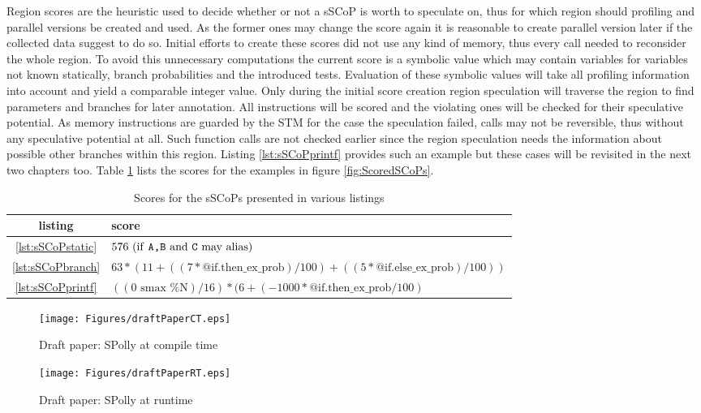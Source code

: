 Region scores are the heuristic used to decide whether or not a sSCoP is worth
to speculate on, thus for which region should profiling and parallel versions
be created and used. As the former ones may change the score again it is 
reasonable to create parallel version later if the collected data suggest to do
so. Initial efforts to create these scores did not use any kind of 
memory, thus every call needed to reconsider the whole region. To avoid this
unnecessary computations the current score is a symbolic value which may contain
variables for variables not known statically, branch probabilities and the 
introduced tests. Evaluation of these symbolic values will take all profiling
information into account and yield a comparable integer value. 
Only during the initial score creation region speculation will
traverse the region to find parameters and branches for later annotation.
All instructions will be scored and the violating ones
will be checked for their speculative potential.
As memory instructions are 
guarded by the STM for the case the speculation failed, calls may not be
reversible, thus without any speculative potential at all. Such function calls
are not checked earlier since the region speculation needs the information about
possible other branches within this region. Listing \ref{lst:sSCoPprintf} 
provides such an example but these cases will be revisited in the next 
two chapters too. Table \ref{tab:Scores} lists the scores for the examples in 
figure \ref{fig:ScoredSCoPs}. 


\begin{table}[htbp]
  \centering
  \caption{Scores for the sSCoPs presented in various listings}
  \begin{tabular}{ c l}
    listing & score \\
    \hline
    \ref{lst:sSCoPstatic} & $ 576 \hfill \text{  (if \texttt{A,B} and \texttt{C} may alias)} $ \\
    \ref{lst:sSCoPbranch} & $63 * (11 + ((7 * \text{@if.then\_ex\_prob}) / 100) + ((5 * \text{@if.else\_ex\_prob}) / 100)) $ \\
    \ref{lst:sSCoPprintf} & $((0\text{ smax }\%\text{N}) / 16) * (6 + (-1000 * \text{@if.then\_ex\_prob} / 100)$ \\
   \end{tabular}
  \label{tab:Scores}
\end{table}





\clearpage
\begin{figure}[htbp]
  \centering
  \texttt{[image: Figures/draftPaperCT.eps]}
  \caption{Draft paper: SPolly at compile time}
  \label{fig:draftPaperCT}  
\end{figure}
\begin{figure}[htbp]
  \centering
  \texttt{[image: Figures/draftPaperRT.eps]}
  \caption{Draft paper: SPolly at runtime}
  \label{fig:draftPaperCT}  
\end{figure}
\clearpage

